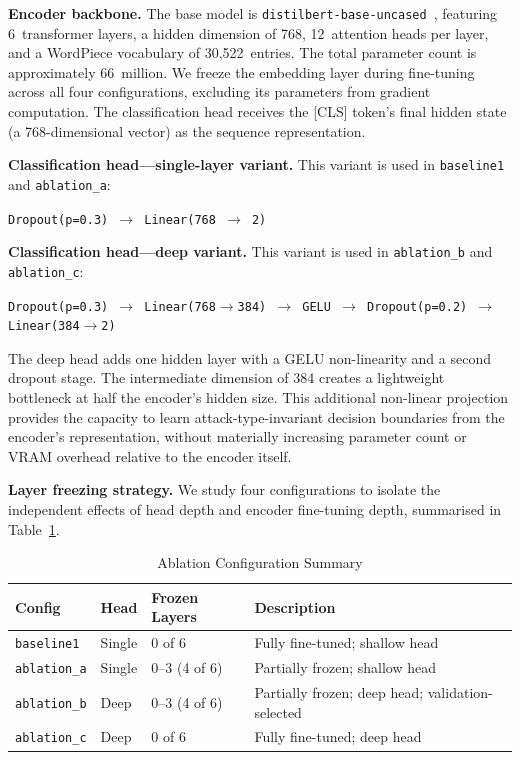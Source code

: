 \documentclass[conference]{IEEEtran}
\begin{document}
\textbf{Encoder backbone.} The base model is \texttt{distilbert-base-uncased}~\cite{sanh2019},
featuring 6~transformer layers, a hidden dimension of 768, 12~attention heads per layer,
and a WordPiece vocabulary of 30,522~entries. The total parameter count is approximately
66~million. We freeze the embedding layer during fine-tuning across all four configurations,
excluding its parameters from gradient computation. The classification head receives the
[CLS] token's final hidden state (a 768-dimensional vector) as the sequence representation.

\textbf{Classification head---single-layer variant.} This variant is used in
\texttt{baseline1} and \texttt{ablation\_a}:
\begin{center}
\small\texttt{Dropout(p=0.3) $\rightarrow$ Linear(768 $\rightarrow$ 2)}
\end{center}

\textbf{Classification head---deep variant.} This variant is used in
\texttt{ablation\_b} and \texttt{ablation\_c}:
\begin{center}
\small\texttt{Dropout(p=0.3) $\rightarrow$ Linear(768$\rightarrow$384)
$\rightarrow$ GELU $\rightarrow$ Dropout(p=0.2) $\rightarrow$ Linear(384$\rightarrow$2)}
\end{center}
The deep head adds one hidden layer with a GELU non-linearity and a second dropout stage.
The intermediate dimension of 384 creates a lightweight bottleneck at half the encoder's
hidden size. This additional non-linear projection provides the capacity to learn
attack-type-invariant decision boundaries from the encoder's representation, without
materially increasing parameter count or VRAM overhead relative to the encoder itself.

\textbf{Layer freezing strategy.} We study four configurations to isolate the independent
effects of head depth and encoder fine-tuning depth, summarised in Table~\ref{tab:configs}.

\begin{table}[t]
\caption{Ablation Configuration Summary}
\label{tab:configs}
\begin{center}
\small
\begin{tabular}{lllp{3.5cm}}
\toprule
\textbf{Config} & \textbf{Head} & \textbf{Frozen Layers} & \textbf{Description}\\
\midrule
\texttt{baseline1} & Single & 0 of 6 & Fully fine-tuned; shallow head\\
\texttt{ablation\_a} & Single & 0--3 (4 of 6) & Partially frozen; shallow head\\
\texttt{ablation\_b} & Deep & 0--3 (4 of 6) & Partially frozen; deep head; validation-selected\\
\texttt{ablation\_c} & Deep & 0 of 6 & Fully fine-tuned; deep head\\
\bottomrule
\end{tabular}
\end{center}
\end{table}
\end{document}
